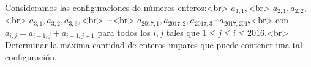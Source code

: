 Consideramos las configuraciones de números enteros:<br>
$a_{1,1},$<br>
$a_{2,1}, a_{2,2},$<br>
$a_{3,1}, a_{3,2}, a_{3,3},$<br>
$\cdots$<br>
$a_{2017,1}, a_{2017,2}, a_{2017,3} \cdots a_{2017,2017}$<br>
con $a_{i,j} = a_{i+1,j} + a_{i+1,j+1}$ para todos los $i,j$ tales que $1 \leq j \leq i \leq 2016$.<br>
Determinar la máxima cantidad de enteros impares que puede contener una tal configuración.
